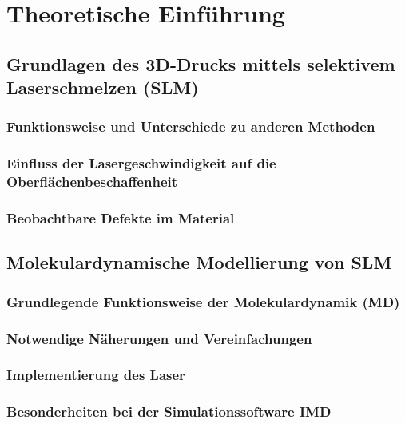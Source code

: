 \chapter{Theoretische Einführung}



\section{Grundlagen des 3D-Drucks mittels selektivem Laserschmelzen (SLM)}
    \subsection{Funktionsweise und Unterschiede zu anderen Methoden}
    \subsection{Einfluss der Lasergeschwindigkeit auf die Oberflächenbeschaffenheit}
    \subsection{Beobachtbare Defekte im Material}


\section{Molekulardynamische Modellierung von SLM}
    \subsection{Grundlegende Funktionsweise der Molekulardynamik (MD)}
    \subsection{Notwendige Näherungen und Vereinfachungen}
    \subsection{Implementierung des Laser}
    \subsection{Besonderheiten bei der Simulationssoftware IMD}